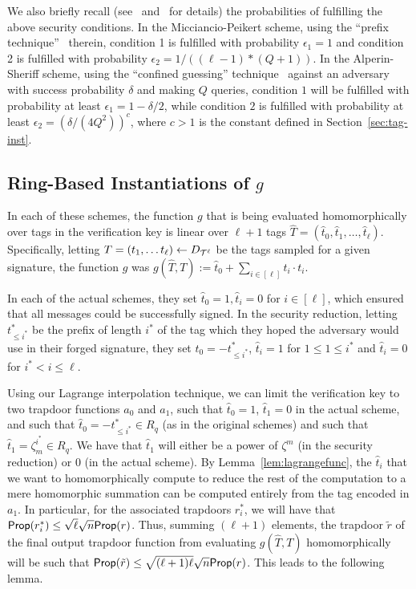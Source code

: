 We also briefly recall (see~\cite{DBLP:conf/eurocrypt/MicciancioP12}
and~\cite{DBLP:conf/pkc/Alperin-Sheriff15} for details) the
probabilities of fulfilling the above security conditions. In the
Micciancio-Peikert scheme, using the ``prefix
technique''~\cite{DBLP:conf/eurocrypt/HohenbergerW09} therein,
condition 1 is fulfilled with probability $\epsilon_1=1$ and condition
2 is fulfilled with probability $\epsilon_2=1/((\ell-1)*(Q+1))$. In
the Alperin-Sheriff scheme, using the ``confined guessing'' technique~\cite{bohl2013confined}
against an adversary with success probability $\delta$ and making $Q$
queries, condition $1$ will be fulfilled with probability at least
$\epsilon_1=1-\delta/2$, while condition $2$ is fulfilled with
probability at least $\epsilon_2=(\delta/(4Q^2))^c$, where $c>1$ is the constant defined in Section~\ref{sec:tag-inst}.




\subsection{Ring-Based Instantiations of $g$}
\label{sec:ring-based-inst-1}

In each of these schemes, the function $g$ that is being evaluated
homomorphically over tags in the verification key is linear over $\ell+1$
tags $\hat{T}=(\hat{t}_0,\hat{t}_1, \ldots, \hat{t}_{\ell})$. Specifically, letting $T= (t_1, \ldots t_{\ell})
\gets D_{\mathcal{T}^{\ell}}$ be the tags sampled for a given signature, the
function $g$ was 
$g(\hat{T},T) := \hat{t}_0 + \sum_{i \in [\ell]}\hat{t}_i\cdot t_i$.

In each of the actual schemes, they set $\hat{t}_0 = 1, \hat{t}_i = 0$
for $i \in [\ell]$, which ensured that all messages could be
successfully signed. In the security reduction,  letting
$t^*_{\leq i^*}$ be the prefix of length $i^*$ of the tag which
they hoped the adversary would use in their forged signature, they set
$\hat{t}_0 = -t_{\leq i^*}^*$, $\hat{t}_i = 1$ for $1 \leq 1 \leq i^*$
and $\hat{t}_i=0$ for $i^* < i \leq \ell$.  

Using our Lagrange interpolation technique, we can limit the
verification key to two trapdoor functions $a_0$ and $a_1$, such that
$\hat{t}_0=1$, $\hat{t}_1=0$ in the actual scheme, and such that
$\hat{t}_0 = -t_{\leq i^*}^* \in R_q$ (as in the original schemes) and
such that $\hat{t}_1 = \zeta_{m}^{i^*} \in R_q$.  We have that
$\hat{t}_1$ will either be a power of
$\zeta^{m}$ (in the security reduction) or $0$ (in the actual
scheme). By Lemma~\ref{lem:lagrangefunc}, the $\hat{t}_i$ that
we want to homomorphically compute to reduce the rest of the
computation to a mere homomorphic summation can be computed entirely
from the tag encoded in $a_1$. In particular, for the associated
trapdoors $r^*_i$, we will have that
$\mathsf{Prop}(r_i^*) \leq \sqrt{\ell} \sqrt{n}\mathsf{Prop}(r)$. Thus, summing
$(\ell+1)$ elements, the trapdoor $\tilde{r}$ of the final output
trapdoor function from evaluating $g(\hat{T},T)$ homomorphically will
be such that
$\mathsf{Prop}(\tilde{r})\leq \sqrt{(\ell+1)\ell} \sqrt{n}
\mathsf{Prop}(r)$. This leads to the following lemma.

